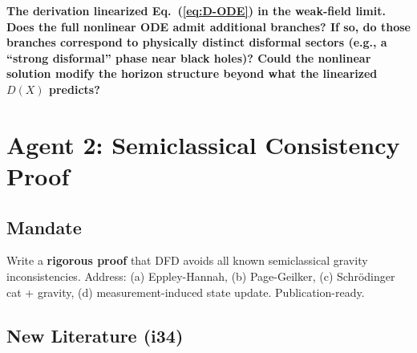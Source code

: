 \documentclass[11pt,a4paper]{article}
\begin{document}
\textbf{The derivation linearized Eq.~(\ref{eq:D-ODE}) in the weak-field limit. Does the full nonlinear ODE admit additional branches? If so, do those branches correspond to physically distinct disformal sectors (e.g., a ``strong disformal'' phase near black holes)? Could the nonlinear solution modify the horizon structure beyond what the linearized $D(X)$ predicts?}

\newpage

\section{Agent 2: Semiclassical Consistency Proof}
\label{sec:agent2}

\subsection{Mandate}

Write a \textbf{rigorous proof} that DFD avoids all known semiclassical gravity inconsistencies. Address: (a) Eppley-Hannah, (b) Page-Geilker, (c) Schr\"odinger cat + gravity, (d) measurement-induced state update. Publication-ready.

\subsection{New Literature (i34)}
\end{document}

